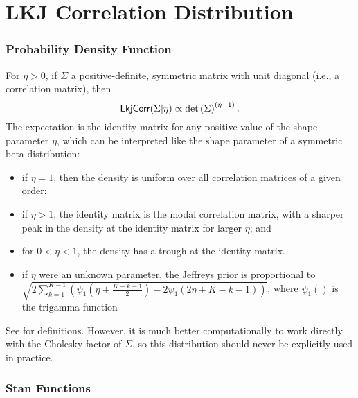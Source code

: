\section{LKJ Correlation Distribution}\label{lkj-correlation.section}

\subsubsection{Probability Density Function}

For $\eta > 0$, if $\Sigma$ a positive-definite, symmetric matrix with
unit diagonal (i.e., a correlation matrix), then
%
\[
\distro{LkjCorr}(\Sigma|\eta)
\propto \det \left( \Sigma \right)^{(\eta - 1)}.
\]
%
The expectation is the identity matrix for any positive value of the 
shape parameter $\eta$, which can be interpreted like the shape parameter
of a symmetric beta distribution:
\begin{itemize}
\item if $\eta = 1$, then the density is uniform over all correlation
  matrices of a given order;
\item if $\eta > 1$, the identity matrix is the modal correlation
  matrix, with a sharper peak in the density at the identity matrix
  for larger $\eta$; and
\item for $0 < \eta < 1$, the density has a trough at the identity
  matrix.
\item if $\eta$ were an unknown parameter, the Jeffreys prior is
  proportional to $\sqrt{2\sum_{k=1}^{K-1}\left(
  \psi_1\left(\eta+\frac{K-k-1}{2}\right) - 
  2\psi_1\left(2\eta+K-k-1 \right)\right)}$, where $\psi_1()$ is the
  trigamma function
\end{itemize}
See \citep{LewandowskiKurowickaJoe:2009} for definitions. However, it
is much better computationally to work directly with the Cholesky factor
of $\Sigma$, so this distribution should never be explicitly used in 
practice.


\subsubsection{Stan Functions}

\begin{description}
%
%
\end{description}
\begin{description}
\end{description}


